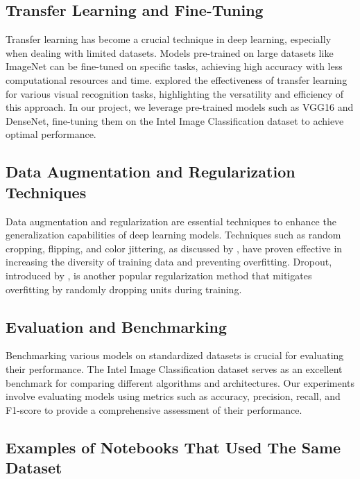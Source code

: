 \documentclass[conference]{IEEEtran}
\begin{document}
\subsection{Transfer Learning and Fine-Tuning}

Transfer learning has become a crucial technique in deep learning, especially when dealing with limited datasets. Models pre-trained on large datasets like ImageNet can be fine-tuned on specific tasks, achieving high accuracy with less computational resources and time. \cite{sharif2014cnn} explored the effectiveness of transfer learning for various visual recognition tasks, highlighting the versatility and efficiency of this approach. In our project, we leverage pre-trained models such as VGG16 and DenseNet, fine-tuning them on the Intel Image Classification dataset to achieve optimal performance.

\subsection{Data Augmentation and Regularization Techniques}

Data augmentation and regularization are essential techniques to enhance the generalization capabilities of deep learning models. Techniques such as random cropping, flipping, and color jittering, as discussed by \cite{krizhevsky2012imagenet}, have proven effective in increasing the diversity of training data and preventing overfitting. Dropout, introduced by \cite{srivastava2014dropout}, is another popular regularization method that mitigates overfitting by randomly dropping units during training.

\subsection{Evaluation and Benchmarking}

Benchmarking various models on standardized datasets is crucial for evaluating their performance. The Intel Image Classification dataset serves as an excellent benchmark for comparing different algorithms and architectures. Our experiments involve evaluating models using metrics such as accuracy, precision, recall, and F1-score to provide a comprehensive assessment of their performance.

\subsection{Examples of Notebooks That Used The Same Dataset}
\end{document}

